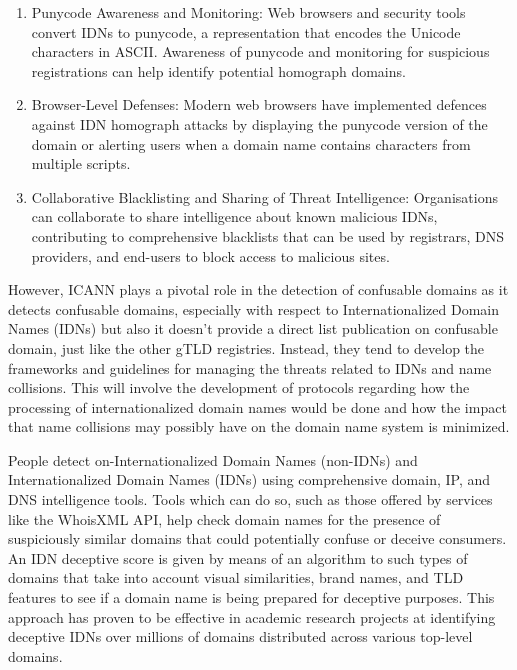 \begin{enumerate}
  \item Punycode Awareness and Monitoring: Web browsers and security tools convert IDNs to punycode, a representation that encodes the Unicode characters in ASCII. Awareness of punycode and monitoring for suspicious registrations can help identify potential homograph domains. \cite{SOCRadar2023}
  \item Browser-Level Defenses: Modern web browsers have implemented defences against IDN homograph attacks by displaying the punycode version of the domain or alerting users when a domain name contains characters from multiple scripts. \cite{Malwarebytes2017}
  \item Collaborative Blacklisting and Sharing of Threat Intelligence: Organisations can collaborate to share intelligence about known malicious IDNs, contributing to comprehensive blacklists that can be used by registrars, DNS providers, and end-users to block access to malicious sites. \cite{CyberThreatAlliance2023}
  
\end{enumerate}


However, ICANN plays a pivotal role in the detection of confusable domains as it detects confusable domains, especially with respect to Internationalized Domain Names (IDNs) but also it doesn't provide a direct list publication on confusable domain, just like the other gTLD registries. Instead, they tend to develop the frameworks and guidelines for managing the threats related to IDNs and name collisions. This will involve the development of protocols regarding how the processing of internationalized domain names would be done and how the impact that name collisions may possibly have on the domain name system is minimized. \cite{ICANNIDNs}

People detect on-Internationalized Domain Names (non-IDNs) and Internationalized Domain Names (IDNs) using comprehensive domain, IP, and DNS intelligence tools. Tools which can do so, such as those offered by services like the WhoisXML API, help check domain names for the presence of suspiciously similar domains that could potentially confuse or deceive consumers. An IDN deceptive score is given by means of an algorithm to such types of domains that take into account visual similarities, brand names, and TLD features to see if a domain name is being prepared for deceptive purposes. This approach has proven to be effective in academic research projects at identifying deceptive IDNs over millions of domains distributed across various top-level domains. \cite{WhoisXMLAPI}

